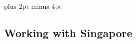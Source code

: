 \documentclass[a4paper,titlepage,draft]{article}
\begin{document}
\parindent=0pt %
\parskip=8pt plus 2pt minus 4pt

\setcounter{page}{1}

\tableofcontents
\newpage

\begin{spacing}{1.15}
%

\pagebreak
\section{Working with Singapore}


\end{spacing}
\pagebreak


\newpage
\appendix


%
\end{document}

